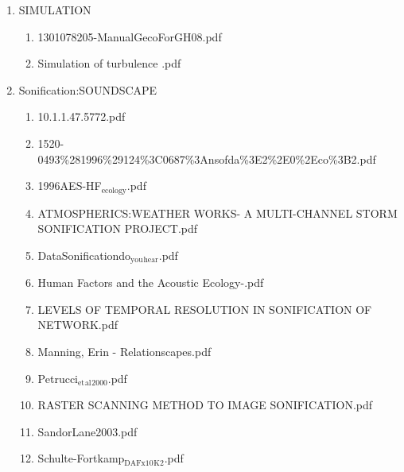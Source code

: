 \documentclass[11pt]{article}
\begin{document}
\begin{enumerate}
\begin{enumerate}
\begin{enumerate}
\begin{enumerate}
\item SIMULATION
\label{sec-1-1-1-1-7-3-43}
\begin{enumerate}
\item 1301078205-ManualGecoForGH08.pdf
\label{sec-1-1-1-1-7-3-43-1}

\item Simulation of turbulence .pdf
\label{sec-1-1-1-1-7-3-43-2}
\end{enumerate}

\item Sonification:SOUNDSCAPE
\label{sec-1-1-1-1-7-3-44}
\begin{enumerate}
\item 10.1.1.47.5772.pdf
\label{sec-1-1-1-1-7-3-44-1}

\item 1520-0493\%281996\%29124\%3C0687\%3Ansofda\%3E2\%2E0\%2Eco\%3B2.pdf
\label{sec-1-1-1-1-7-3-44-2}

\item 1996AES-HF$_{\text{ecology}}$.pdf
\label{sec-1-1-1-1-7-3-44-3}

\item ATMOSPHERICS:WEATHER WORKS- A MULTI-CHANNEL STORM SONIFICATION PROJECT.pdf
\label{sec-1-1-1-1-7-3-44-4}

\item DataSonificationdo$_{\text{you}}$$_{\text{hear}}$.pdf
\label{sec-1-1-1-1-7-3-44-5}

\item Human Factors and the Acoustic Ecology-.pdf
\label{sec-1-1-1-1-7-3-44-6}

\item LEVELS OF TEMPORAL RESOLUTION IN SONIFICATION OF NETWORK.pdf
\label{sec-1-1-1-1-7-3-44-7}

\item Manning, Erin - Relationscapes.pdf
\label{sec-1-1-1-1-7-3-44-8}

\item Petrucci$_{\text{et}}$$_{\text{al}}$$_{\text{2000}}$.pdf
\label{sec-1-1-1-1-7-3-44-9}

\item RASTER SCANNING METHOD TO IMAGE SONIFICATION.pdf
\label{sec-1-1-1-1-7-3-44-10}

\item SandorLane2003.pdf
\label{sec-1-1-1-1-7-3-44-11}

\item Schulte-Fortkamp$_{\text{DAFx10}}$$_{\text{K2}}$.pdf
\label{sec-1-1-1-1-7-3-44-12}


\end{enumerate}
\end{enumerate}
\end{enumerate}
\end{enumerate}
\end{enumerate}
\end{document}
